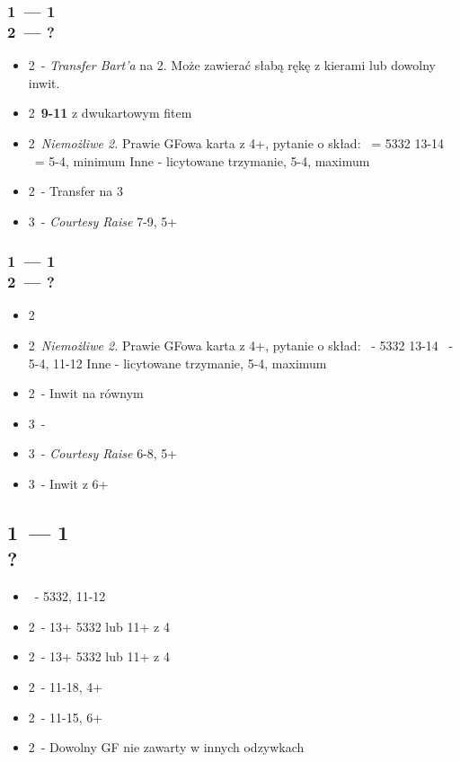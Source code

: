 \documentclass[12pt, a4paper]{article}
\begin{document}
    \subsubsection{1\hearts\ --- 1\ntx \\ 2\clubs\ --- ?}
    \begin{itemize}
        \item 2\diams\ - \emph{Transfer Bart'a} na 2\hearts.
        Może zawierać słabą rękę z kierami lub dowolny inwit.
        \item 2\hearts\ \textbf{9-11} z dwukartowym fitem
        \item 2\spades\ \emph{Niemożliwe 2\spades.} Prawie GFowa karta z 4+\clubs, pytanie o skład:
        \nt\ = 5332 13-14
        \clubs\ = 5-4, minimum
        \subitem Inne - licytowane trzymanie, 5-4, maximum \gf
        \item 2\nt\ - Transfer na 3\diams
        \item 3\clubs\ - \emph{Courtesy Raise} 7-9, 5+\clubs
    \end{itemize}

    \subsubsection{1\hearts\ --- 1\ntx \\ 2\diams\ --- ?}
    \begin{itemize}
        \item 2\hearts\ \soff
        \item 2\spades\ \emph{Niemożliwe 2\spades.} Prawie GFowa karta z 4+\diams, pytanie o skład:
        \nt\ - 5332 13-14
        \diams\ - 5-4, 11-12
        \subitem Inne - licytowane trzymanie, 5-4, maximum \gf
        \item 2\nt\ - Inwit na równym
        \item 3\clubs\ - \soff
        \item 3\diams\ - \emph{Courtesy Raise} 6-8, 5+\diams
        \item 3\hearts\ - Inwit z 6+\hearts
    \end{itemize}
    

    \subsection{1\spades\ --- 1\ntx \\ ?}
    \begin{itemize}
        \item \pass\ - 5332, 11-12
        \item 2\clubs\ - 13+ 5332 lub 11+ z 4\clubs
        \item 2\diams\ - 13+ 5332 lub 11+ z 4\diams 
        \item 2\hearts\ - 11-18, 4+\hearts 
        \item 2\spades\ - 11-15, 6+\spades
        \item 2\nt\ - Dowolny GF nie zawarty w innych odzywkach \gf 
    \end{itemize}
\end{document}
